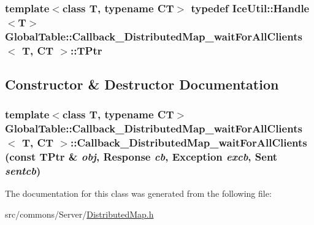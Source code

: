 \label{class_global_table_1_1_callback___distributed_map__wait_for_all_clients_ae931e7cc8794e1f268b0cc30db99f3d6}
\hypertarget{class_global_table_1_1_callback___distributed_map__wait_for_all_clients_a0efb2e7297b9ccbba6e37fb4ce9a201e}{
\subsubsection[{TPtr}]{\setlength{\rightskip}{0pt plus 5cm}template$<$class T, typename CT$>$ typedef IceUtil::Handle$<$T$>$ {\bf GlobalTable::Callback\_\-DistributedMap\_\-waitForAllClients}$<$ T, CT $>$::{\bf TPtr}}}
\label{class_global_table_1_1_callback___distributed_map__wait_for_all_clients_a0efb2e7297b9ccbba6e37fb4ce9a201e}


\subsection{Constructor \& Destructor Documentation}
\hypertarget{class_global_table_1_1_callback___distributed_map__wait_for_all_clients_ad06f4d3bc88d4e734d28b6334a587f96}{
\subsubsection[{Callback\_\-DistributedMap\_\-waitForAllClients}]{\setlength{\rightskip}{0pt plus 5cm}template$<$class T, typename CT$>$ {\bf GlobalTable::Callback\_\-DistributedMap\_\-waitForAllClients}$<$ T, CT $>$::{\bf Callback\_\-DistributedMap\_\-waitForAllClients} (const {\bf TPtr} \& {\em obj}, \/  {\bf Response} {\em cb}, \/  {\bf Exception} {\em excb}, \/  {\bf Sent} {\em sentcb})}}
\label{class_global_table_1_1_callback___distributed_map__wait_for_all_clients_ad06f4d3bc88d4e734d28b6334a587f96}


The documentation for this class was generated from the following file:\begin{DoxyCompactItemize}
\item 
src/commons/Server/\hyperlink{_distributed_map_8h}{DistributedMap.h}\end{DoxyCompactItemize}

